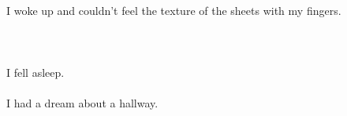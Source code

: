 \documentclass{article}
\begin{document}
    \section{}
    I woke up and couldn't feel the texture of the sheets with my fingers.\\\\ 
    \newpage
    
    \section{}
    I fell asleep.\\\\I had a dream about a hallway.\\\\ 
    \newpage
    
    
\end{document}
